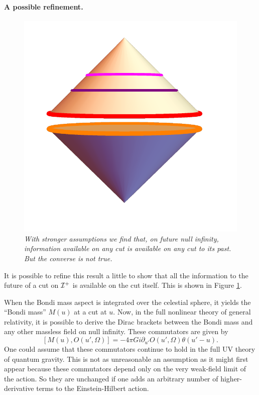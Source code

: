 \documentclass[12pt]{article}
\def\gnewt{G}
\newcommand{\be}{\begin{equation}}
\newcommand{\ee}{\end{equation}}
\def \sph{{\Omega}}
\def \scrip{{\cal I}^{+}}
\begin{document}
\paragraph{\bf A possible refinement. \\}
\begin{figure}[!ht]
\begin{center}
\includegraphics[height=0.5\textheight]{bdrynullwithcuts.pdf}
\caption{\em With stronger assumptions we find that, on future null infinity, information available on any cut is available on any cut to its past. But the converse is not true. \label{cutinfo}}
\end{center}
\end{figure}
It is possible to refine this result a little to show that all the information to the future of a cut on $\scrip$ is available on the cut itself. This is shown in Figure \ref{cutinfo}.

 When the Bondi mass aspect is integrated over the celestial sphere, it yields the ``Bondi mass'' $M(u)$ at a cut at $u$. Now, in the full nonlinear theory of general relativity, it is possible to derive the Dirac brackets between the Bondi mass and any other massless field on null infinity. These commutators are given by
\be
\label{commgr}
[M(u), O(u', \sph)] = -4 \pi \gnewt i  \partial_{u'} O(u', \sph) \theta(u' - u).
\ee
One could assume that these commutators continue to hold in the full UV theory of quantum gravity. This is not as unreasonable an assumption as it might first appear because these commutators depend only on the very weak-field limit of the action. So they are unchanged if one adds an arbitrary number of higher-derivative terms to the Einstein-Hilbert action.
\end{document}
